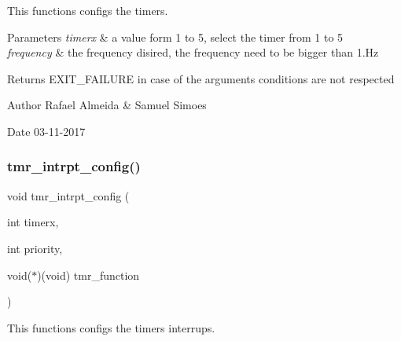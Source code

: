 This functions configs the timer\textquotesingle{}s. 


\begin{DoxyParams}{Parameters}
{\em timerx} & a value form 1 to 5, select the timer from 1 to 5 \\
\hline
{\em frequency} & the frequency disired, the frequency need to be bigger than 1.\+Hz\\
\hline
\end{DoxyParams}
\begin{DoxyReturn}{Returns}
E\+X\+I\+T\+\_\+\+F\+A\+I\+L\+U\+RE in case of the argument\textquotesingle{}s conditions are not respected 
\end{DoxyReturn}
\begin{DoxyAuthor}{Author}
Rafael Almeida \& Samuel Simoes 
\end{DoxyAuthor}
\begin{DoxyDate}{Date}
03-\/11-\/2017 
\end{DoxyDate}
\mbox{\label{_timer__libs_8h_acf42c44ac046a888c4a5c615adfd32c8}} 
\subsubsection{tmr\+\_\+intrpt\+\_\+config()}
{\footnotesize\ttfamily void tmr\+\_\+intrpt\+\_\+config (\begin{DoxyParamCaption}\item[{int}]{timerx,  }\item[{int}]{priority,  }\item[{void($\ast$)(void)}]{tmr\+\_\+function }\end{DoxyParamCaption})}



This functions configs the timer\textquotesingle{}s interrups. 


